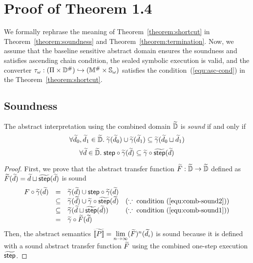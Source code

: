 \section{Proof of Theorem 1.4}\label{sec:proof}

We formally rephrase the meaning of Theorem~\ref{theorem:shortcut} in
Theorem~\ref{theorem:soundness} and Theorem~\ref{theorem:termination}.  Now, we
assume that the baseline sensitive abstract domain ensures the soundness and
satisfies ascending chain condition, the sealed symbolic execution is valid,
and the converter ${\tau}_\omega: (\Pi \times {\mathbb{D}}^{\#}) \hookrightarrow
({\mathbb{M}}^{\#} \times {\mathbb{S}}_\omega)$ satisfies the
condition~(\ref{equ:asc-cond}) in the Theorem~\ref{theorem:shortcut}.


\subsection{Soundness}

\begin{theorem}[Soundness]\label{theorem:soundness}
  The abstract interpretation using the combined domain $\widetilde{\mathbb{D}}$ is
  \textit{sound} if and only if
  \begin{equation}\label{equ:comb-sound1}
    \forall \widetilde{d}_0, \widetilde{d}_1 \in \widetilde{\mathbb{D}}. \; \widetilde{\gamma}(\widetilde{d}_0) \cup
    \widetilde{\gamma}(\widetilde{d}_1) \subseteq \widetilde{\gamma}(\widetilde{d}_0 \sqcup \widetilde{d}_1)
  \end{equation}
  \begin{equation}\label{equ:comb-sound2}
    \forall \widetilde{d} \in \widetilde{\mathbb{D}}. \; \textsf{step} \circ \widetilde{\gamma}(\widetilde{d}) \subseteq
    \widetilde{\gamma} \circ \widetilde{\textsf{step}}(\widetilde{d})\\
  \end{equation}
\end{theorem}
\begin{proof}
  First, we prove that the abstract transfer function $\widetilde{F}: \widetilde{\mathbb{D}}
  \rightarrow \widetilde{\mathbb{D}}$ defined as $\widetilde{F}(\widetilde{d}) = \widetilde{d} \sqcup
  \widetilde{\textsf{step}}(\widetilde{d})$ is sound
  \[
    \begin{array}{rcll}
      F \circ \widetilde{\gamma}(\widetilde{d})
      &=& \widetilde{\gamma}(\widetilde{d}) \cup \textsf{step} \circ \widetilde{\gamma}(\widetilde{d})\\
      &\subseteq& \widetilde{\gamma}(\widetilde{d}) \cup \widetilde{\gamma} \circ \widetilde{\textsf{step}}(\widetilde{d})
      & (\because \; \text{condition~(\ref{equ:comb-sound2})})\\
      &\subseteq& \widetilde{\gamma}(\widetilde{d} \sqcup \widetilde{\textsf{step}}(\widetilde{d}))
      & (\because \; \text{condition~(\ref{equ:comb-sound1})})\\
      &=& \widetilde{\gamma} \circ \widetilde{F}(\widetilde{d})\\
    \end{array}
  \]
  Then, the abstract semantics $\widetilde{\llbracket P \rrbracket} = \underset{n \rightarrow
  \infty}{\lim}{(\widetilde{F})^n(\widetilde{d}_\iota)} $ is sound because it is defined
  with a sound abstract transfer function $\widetilde{F}$ using the combined
  one-step execution $\widetilde{\textsf{step}}$.
\end{proof}


